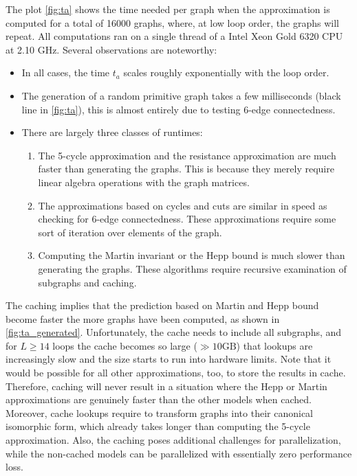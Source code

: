 \documentclass[11pt]{scrartcl}
\numberwithin{equation}{section}
\begin{document}
The plot \cref{fig:ta} shows the time needed per graph when the approximation is computed for a total of 16000 graphs, where, at low loop order, the graphs will repeat. All computations ran on a single thread of a Intel Xeon Gold 6320 CPU at 2.10 GHz. Several observations are noteworthy:
\begin{itemize}
	\item In all cases, the time $t_a$  scales roughly exponentially with the loop order.
	\item The generation of a random primitive graph takes a few milliseconds (black line in \cref{fig:ta}), this is almost entirely due to testing 6-edge connectedness.
	\item There are largely three classes of runtimes:
	\begin{enumerate}
		\item The 5-cycle approximation and the resistance approximation are much faster than generating the graphs. This is because they merely require linear algebra operations with the graph matrices.
		\item The approximations based on cycles and cuts are similar in speed as checking for 6-edge connectedness. These approximations require some sort of iteration over elements of the graph.
		\item Computing the Martin invariant or the Hepp bound is much slower than generating the graphs. These algorithms require recursive examination of subgraphs and  caching.
	\end{enumerate}
\end{itemize}

The caching implies that the prediction based on Martin and Hepp bound become faster  the more graphs have been computed, as shown in \cref{fig:ta_generated}. Unfortunately, the cache needs to include all subgraphs, and  for $L \geq 14$ loops the cache becomes so large ($\gg 10\text{GB}$) that lookups are increasingly slow and the size starts to run into hardware limits. Note that it would be possible  for all other approximations, too, to store the results in cache. Therefore, caching will never result in a situation where the Hepp or Martin approximations are genuinely faster than the other models when cached. Moreover, cache lookups require to transform graphs into their canonical isomorphic form, which already takes longer than computing the 5-cycle approximation. Also, the caching poses additional challenges for parallelization, while the non-cached models can be parallelized with essentially zero performance loss. 
\end{document}
